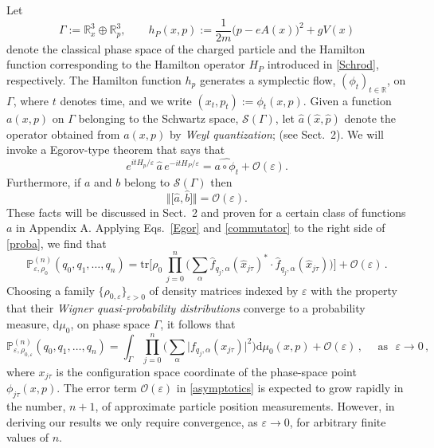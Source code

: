 \documentclass[11pt]{article}
\begin{document}
Let 
\begin{equation}\label{phase space}
\Gamma:= \mathbb{R}^{3}_x \oplus \mathbb{R}^{3}_p, \qquad h_P(x, p):= \frac{1}{2m}\big(p-eA(x)\big)^{2} + gV(x)
\end{equation}
denote the classical phase space of the charged particle and the Hamilton function corresponding to the Hamilton
operator $H_P$ introduced in \eqref{Schrod}, respectively. The Hamilton function $h_p$ generates a
symplectic flow, $(\phi_t)_{t\in \mathbb{R}}$, on $\Gamma$, where $t$ denotes time, and we write
$(x_t, p_t) := \phi_{t}(x,p)$. Given a function $a(x,p)$ on $\Gamma$ belonging to the Schwartz space, 
$\mathcal{S}(\Gamma)$, let $\widehat{a}(\hat{x}, \hat{p})$ denote the operator obtained from $a(x,p)$ by 
\textit{Weyl quantization}; (see Sect.~2). We will invoke a Egorov-type theorem that says that
\begin{equation}\label{Egor}
e^{itH_{p}/\varepsilon} \,\widehat{a} \, e^{-itH_{P}/\varepsilon} = \widehat{a \circ \phi_t} + \mathcal{O}(\varepsilon).
\end{equation}
Furthermore, if $a$ and $b$ belong to $\mathcal{S}(\Gamma)$ then
\begin{equation}\label{commutator}
\Vert \big[\widehat{a}, \widehat{b}\big] \Vert= \mathcal{O}(\varepsilon).
\end{equation}
These facts will be discussed in Sect.~2 and proven for a certain class of functions $a$ in Appendix A. Applying Eqs.~\eqref{Egor} and \eqref{commutator} to
the right side of \eqref{proba}, we find that
\begin{equation}\label{proba'}
\mathbb{P}_{\varepsilon, \rho_0}^{(n)}(q_0, q_1, \dots, q_n) = \text{tr}\Big[\rho_0\, \prod_{j=0}^{n} \Big(\sum_{\alpha} 
\widehat{f}_{q_j, \alpha}(\widehat{x}_{j\tau})^{*} \cdot \widehat{f}_{q_j, \alpha}(\widehat{x}_{j\tau})\Big) \Big]+ 
\mathcal{O}(\varepsilon)\,.
\end{equation}
Choosing a family $\big\{ \rho_{0, \varepsilon}\big\}_{\varepsilon >0}$ of density matrices indexed by $\varepsilon$ 
with the property that their \textit{Wigner quasi-probability distributions} converge to a probability measure, 
$\text{d}\mu_{0}$, on phase space $\Gamma$, it follows that
\begin{equation}\label{asymptotics}
\mathbb{P}_{\varepsilon, \rho_{0, \varepsilon}}^{(n)}(q_0, q_1, \dots, q_n) = \int_{\Gamma} \prod_{j=0}^{n} \Big(\sum_{\alpha} 
\big| f_{q_j, \alpha}(x_{j\tau})\big|^{2}\Big) 
\text{d}\mu_{0}(x,p) + \mathcal{O}(\varepsilon)\,, \quad\text{ as } \,\, \varepsilon \rightarrow 0\,,
\end{equation}
where $x_{j\tau}$ is the configuration space coordinate of the phase-space point 
$\phi_{j\tau}(x,p)$. The error term $\mathcal{O}(\varepsilon)$ in \eqref{asymptotics} is expected to grow rapidly 
in the number, $n+1$, of approximate particle position measurements. However, in deriving our results we only
require convergence, as $\varepsilon \rightarrow 0$, for arbitrary finite values of $n$.
\end{document}
